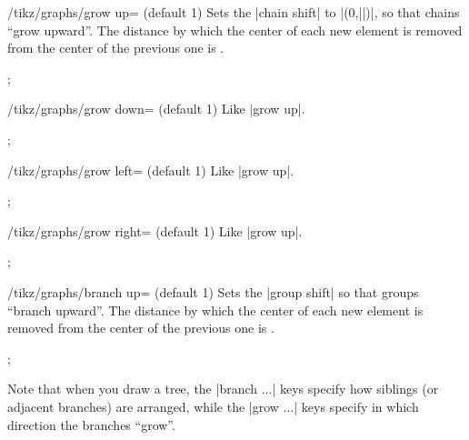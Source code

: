 \begin{key}{/tikz/graphs/grow up= (default 1)}
    Sets the |chain shift| to |(0,||)|, so that chains ``grow
    upward''. The distance by which the center of each new element is removed
    from the center of the previous one is .
\begin{codeexample}[preamble={\usetikzlibrary{graphs}}]
\tikz {};
\end{codeexample}
\end{key}

\begin{key}{/tikz/graphs/grow down= (default 1)}
    Like |grow up|.
\begin{codeexample}[preamble={\usetikzlibrary{graphs}}]
\tikz {};
\end{codeexample}
\end{key}

\begin{key}{/tikz/graphs/grow left= (default 1)}
    Like |grow up|.
\begin{codeexample}[preamble={\usetikzlibrary{graphs}}]
\tikz {};
\end{codeexample}
\end{key}

\begin{key}{/tikz/graphs/grow right= (default 1)}
    Like |grow up|.
\begin{codeexample}[preamble={\usetikzlibrary{graphs}}]
\tikz {};
\end{codeexample}
\end{key}

\begin{key}{/tikz/graphs/branch up= (default 1)}
    Sets the |group shift| so that groups ``branch upward''.  The distance by
    which the center of each new element is removed from the center of the
    previous one is .
\begin{codeexample}[preamble={\usetikzlibrary{graphs}}]
\tikz {};
\end{codeexample}
    Note that when you draw a tree, the |branch ...| keys specify how siblings
    (or adjacent branches) are arranged, while the |grow ...| keys specify in
    which direction the branches ``grow''.
\end{key}

